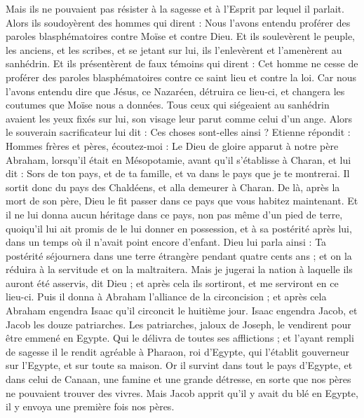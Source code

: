 \begin{multicols}{2}
Mais ils ne pouvaient pas résister à la sagesse et à l'Esprit par lequel il parlait.
Alors ils soudoyèrent des hommes qui dirent : Nous l’avons entendu proférer des paroles blasphématoires contre Moïse et contre Dieu.
Et ils soulevèrent le peuple, les anciens, et les scribes, et se jetant sur lui, ils l'enlevèrent et l'amenèrent au sanhédrin.
Et ils présentèrent de faux témoins qui dirent : Cet homme ne cesse de proférer des paroles blasphématoires contre ce saint lieu et contre la loi.
Car nous l’avons entendu dire que Jésus, ce Nazaréen, détruira ce lieu-ci, et changera les coutumes que Moïse nous a données.
Tous ceux qui siégeaient au sanhédrin avaient les yeux fixés sur lui, son visage leur parut comme celui d'un ange.
\VerseOne{}Alors le souverain sacrificateur lui dit : Ces choses sont-elles ainsi ?
Etienne répondit : Hommes frères et pères, écoutez-moi : Le Dieu de gloire apparut à notre père Abraham, lorsqu’il était en Mésopotamie, avant qu'il s’établisse à Charan, et lui dit :
Sors de ton pays, et de ta famille, et va dans le pays que je te montrerai.
Il sortit donc du pays des Chaldéens, et alla demeurer à Charan. De là, après la mort de son père, Dieu le fit passer dans ce pays que vous habitez maintenant.
Et il ne lui donna aucun héritage dans ce pays, non pas même d’un pied de terre, quoiqu’il lui ait promis de le lui donner en possession, et à sa postérité après lui, dans un temps où il n’avait point encore d’enfant.
Dieu lui parla ainsi : Ta postérité séjournera dans une terre étrangère pendant quatre cents ans ; et on la réduira à la servitude et on la maltraitera.
Mais je jugerai la nation à laquelle ils auront été asservis, dit Dieu ; et après cela ils sortiront, et me serviront en ce lieu-ci.
Puis il donna à Abraham l'alliance de la circoncision ; et après cela Abraham engendra Isaac qu'il circoncit le huitième jour. Isaac engendra Jacob, et Jacob les douze patriarches.
Les patriarches, jaloux de Joseph, le vendirent pour être emmené en Egypte.
Qui le délivra de toutes ses afflictions ; et l’ayant rempli de sagesse il le rendit agréable à Pharaon, roi d’Egypte, qui l’établit gouverneur sur l’Egypte, et sur toute sa maison.
Or il survint dans tout le pays d'Egypte, et dans celui de Canaan, une famine et une grande détresse, en sorte que nos pères ne pouvaient trouver des vivres.
Mais Jacob apprit qu'il y avait du blé en Egypte, il y envoya une première fois nos pères.

\end{multicols}
